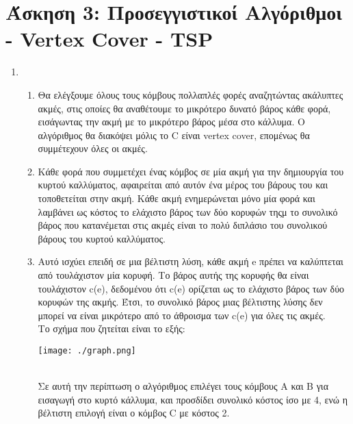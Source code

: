 \documentclass{article}
\begin{document}
\pagebreak

\section{Άσκηση 3: Προσεγγιστικοί Αλγόριθμοι - Vertex Cover - TSP}
\begin{enumerate}
    \item{}
\begin{enumerate}
    \item{}
        Θα ελέγξουμε όλους τους κόμβους πολλαπλές φορές αναζητώντας ακάλυπτες ακμές, στις οποίες 
        θα αναθέτουμε το μικρότερο δυνατό βάρος κάθε φορά, εισάγωντας την ακμή με το μικρότερο βάρος 
        μέσα στο κάλλυμα. Ο αλγόριθμος θα διακόψει μόλις το C είναι vertex cover, επομένως θα συμμέτεχουν
        όλες οι ακμές.\\
    \item{}
        Κάθε φορά που συμμετέχει ένας κόμβος σε μία ακμή για την δημιουργία του κυρτού καλλύματος, αφαιρείται
        από αυτόν ένα μέρος του βάρους του και τοποθετείται στην ακμή. Κάθε ακμή ενημερώνεται μόνο μία
        φορά και λαμβάνει ως κόστος το ελάχιστο βάρος των δύο κορυφών τηςμ το συνολικό βάρος που κατανέμεται
        στις ακμές είναι το πολύ διπλάσιο του συνολικού βάρους του κυρτού καλλύματος.\\
    \item{}
        Αυτό ισχύει επειδή σε μια βέλτιστη λύση, κάθε ακμή e πρέπει να καλύπτεται από τουλάχιστον μία κορυφή.
        Το βάρος αυτής της κορυφής θα είναι τουλάχιστον c(e), δεδομένου ότι c(e) ορίζεται ως το ελάχιστο βάρος
        των δύο κορυφών της ακμής. Έτσι, το συνολικό βάρος μιας βέλτιστης λύσης δεν μπορεί να είναι μικρότερο
        από το άθροισμα των c(e) για όλες τις ακμές.\\

        Το σχήμα που ζητείται είναι το εξής:\\ 

        \begin{center}
            \texttt{[image: ./graph.png]}
        \end{center}\\

        Σε αυτή την περίπτωση ο αλγόριθμος επιλέγει τους κόμβους Α και Β για εισαγωγή στο κυρτό κάλλυμα, 
        και προσδίδει συνολικό κόστος ίσο με 4, ενώ η βέλτιστη επιλογή είναι ο κόμβος C με κόστος 2.\\

        


\end{enumerate}
\end{enumerate}
\end{document}
